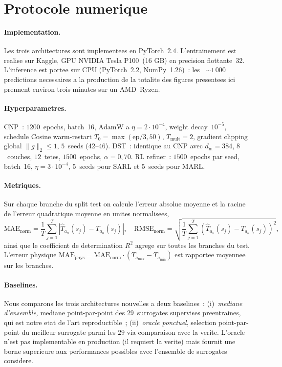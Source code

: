 \documentclass[11pt,a4paper]{article}
\newcommand{\Ta}{T_a}
\begin{document}
\section{Protocole numerique}
\label{sec:exp}

\paragraph{Implementation.} Les trois architectures sont
implementees en PyTorch~2.4. L'entrainement est realise sur
Kaggle, GPU NVIDIA Tesla P100~(16 GB) en precision flottante~32.
L'inference est portee sur CPU (PyTorch~2.2, NumPy~1.26)~: les
~$\sim\!1\,000$ predictions necessaires a la production de la
totalite des figures presentees ici prennent environ trois minutes
sur un AMD~Ryzen.

\paragraph{Hyperparametres.} CNP~: $1200$~epochs, batch~16,
$\mathrm{AdamW}$ a $\eta\!=\!2\!\cdot\!10^{-4}$, weight
decay~$10^{-5}$, schedule Cosine warm-restart $T_0=\max(\text{ep}/3,50)$,
$T_\text{mult}\!=\!2$, gradient clipping global $\|g\|_2\!\leq\!1$,
$5$~seeds (42--46). DST~: identique au CNP avec
$d_\text{m}\!=\!384$, $8$~couches, $12$~tetes, $1500$~epochs,
$\alpha\!=\!0{,}70$. RL refiner~: $1500$~epochs par seed, batch~16,
$\eta\!=\!3\!\cdot\!10^{-4}$, $5$~seeds pour SARL et $5$~seeds pour
MARL.

\paragraph{Metriques.} Sur chaque branche du split test on
calcule l'erreur absolue moyenne et la racine de l'erreur
quadratique moyenne en unites normalisees,
\begin{equation}
\mathrm{MAE}_\text{norm}=\frac{1}{T}\sum_{j=1}^T
|\widehat\Ta_n(s_j)-\Ta_n(s_j)|,
\quad
\mathrm{RMSE}_\text{norm}=\sqrt{\frac{1}{T}\sum_{j=1}^T
(\widehat\Ta_n(s_j)-\Ta_n(s_j))^2},
\end{equation}
ainsi que le coefficient de determination $R^2$ agrege sur
toutes les branches du test. L'erreur physique
$\mathrm{MAE}_\text{phys}=\mathrm{MAE}_\text{norm}\cdot
(\Ta_\text{max}-\Ta_\text{min})$ est rapportee moyennee sur les
branches.

\paragraph{Baselines.} Nous comparons les trois architectures
nouvelles a deux baselines~:
(i)~\emph{mediane d'ensemble}, mediane point-par-point des
$29$~surrogates supervises preentraines, qui est notre etat de
l'art reproductible~;
(ii)~\emph{oracle ponctuel}, selection point-par-point du meilleur
surrogate parmi les $29$ via comparaison avec la verite. L'oracle
n'est pas implementable en production (il requiert la verite) mais
fournit une borne superieure aux performances possibles avec
l'ensemble de surrogates considere.
\end{document}
